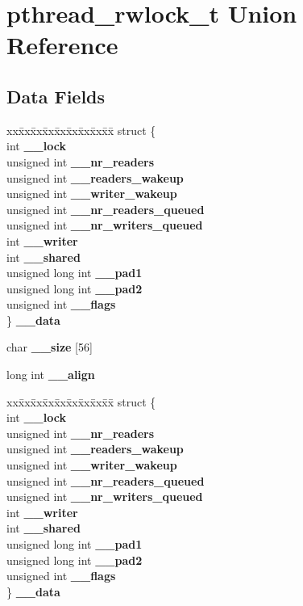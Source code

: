 \section{pthread\_\-rwlock\_\-t Union Reference}
\label{unionpthread__rwlock__t}
\subsection*{Data Fields}
\begin{DoxyCompactItemize}
\item 
\begin{tabbing}
xx\=xx\=xx\=xx\=xx\=xx\=xx\=xx\=xx\=\kill
struct \{\\
\>int {\bf \_\_lock}\\
\>unsigned int {\bf \_\_nr\_readers}\\
\>unsigned int {\bf \_\_readers\_wakeup}\\
\>unsigned int {\bf \_\_writer\_wakeup}\\
\>unsigned int {\bf \_\_nr\_readers\_queued}\\
\>unsigned int {\bf \_\_nr\_writers\_queued}\\
\>int {\bf \_\_writer}\\
\>int {\bf \_\_shared}\\
\>unsigned long int {\bf \_\_pad1}\\
\>unsigned long int {\bf \_\_pad2}\\
\>unsigned int {\bf \_\_flags}\\
\} {\bf \_\_data}\\

\end{tabbing}\item 
char {\bf \_\-\_\-size} [56]
\item 
long int {\bf \_\-\_\-align}
\item 
\begin{tabbing}
xx\=xx\=xx\=xx\=xx\=xx\=xx\=xx\=xx\=\kill
struct \{\\
\>int {\bf \_\_lock}\\
\>unsigned int {\bf \_\_nr\_readers}\\
\>unsigned int {\bf \_\_readers\_wakeup}\\
\>unsigned int {\bf \_\_writer\_wakeup}\\
\>unsigned int {\bf \_\_nr\_readers\_queued}\\
\>unsigned int {\bf \_\_nr\_writers\_queued}\\
\>int {\bf \_\_writer}\\
\>int {\bf \_\_shared}\\
\>unsigned long int {\bf \_\_pad1}\\
\>unsigned long int {\bf \_\_pad2}\\
\>unsigned int {\bf \_\_flags}\\
\} {\bf \_\_data}\\

\end{tabbing}\end{DoxyCompactItemize}


